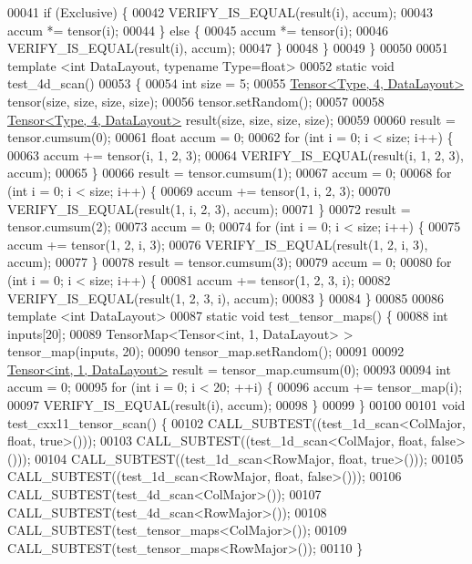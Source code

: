 \begin{DoxyCode}
00041     \textcolor{keywordflow}{if} (Exclusive) \{
00042       VERIFY\_IS\_EQUAL(result(i), accum);
00043       accum *= tensor(i);
00044     \} \textcolor{keywordflow}{else} \{
00045       accum *= tensor(i);
00046       VERIFY\_IS\_EQUAL(result(i), accum);
00047     \}
00048   \}
00049 \}
00050 
00051 \textcolor{keyword}{template} <\textcolor{keywordtype}{int} DataLayout, \textcolor{keyword}{typename} Type=\textcolor{keywordtype}{float}>
00052 \textcolor{keyword}{static} \textcolor{keywordtype}{void} test\_4d\_scan()
00053 \{
00054   \textcolor{keywordtype}{int} size = 5;
00055   \hyperlink{class_eigen_1_1_tensor}{Tensor<Type, 4, DataLayout>} tensor(size, size, size, size);
00056   tensor.setRandom();
00057 
00058   \hyperlink{class_eigen_1_1_tensor}{Tensor<Type, 4, DataLayout>} result(size, size, size, size);
00059 
00060   result = tensor.cumsum(0);
00061   \textcolor{keywordtype}{float} accum = 0;
00062   \textcolor{keywordflow}{for} (\textcolor{keywordtype}{int} i = 0; i < size; i++) \{
00063     accum += tensor(i, 1, 2, 3);
00064     VERIFY\_IS\_EQUAL(result(i, 1, 2, 3), accum);
00065   \}
00066   result = tensor.cumsum(1);
00067   accum = 0;
00068   \textcolor{keywordflow}{for} (\textcolor{keywordtype}{int} i = 0; i < size; i++) \{
00069     accum += tensor(1, i, 2, 3);
00070     VERIFY\_IS\_EQUAL(result(1, i, 2, 3), accum);
00071   \}
00072   result = tensor.cumsum(2);
00073   accum = 0;
00074   \textcolor{keywordflow}{for} (\textcolor{keywordtype}{int} i = 0; i < size; i++) \{
00075     accum += tensor(1, 2, i, 3);
00076     VERIFY\_IS\_EQUAL(result(1, 2, i, 3), accum);
00077   \}
00078   result = tensor.cumsum(3);
00079   accum = 0;
00080   \textcolor{keywordflow}{for} (\textcolor{keywordtype}{int} i = 0; i < size; i++) \{
00081     accum += tensor(1, 2, 3, i);
00082     VERIFY\_IS\_EQUAL(result(1, 2, 3, i), accum);
00083   \}
00084 \}
00085 
00086 \textcolor{keyword}{template} <\textcolor{keywordtype}{int} DataLayout>
00087 \textcolor{keyword}{static} \textcolor{keywordtype}{void} test\_tensor\_maps() \{
00088   \textcolor{keywordtype}{int} inputs[20];
00089   TensorMap<Tensor<int, 1, DataLayout> > tensor\_map(inputs, 20);
00090   tensor\_map.setRandom();
00091 
00092   \hyperlink{class_eigen_1_1_tensor}{Tensor<int, 1, DataLayout>} result = tensor\_map.cumsum(0);
00093 
00094   \textcolor{keywordtype}{int} accum = 0;
00095   \textcolor{keywordflow}{for} (\textcolor{keywordtype}{int} i = 0; i < 20; ++i) \{
00096     accum += tensor\_map(i);
00097     VERIFY\_IS\_EQUAL(result(i), accum);
00098   \}
00099 \}
00100 
00101 \textcolor{keywordtype}{void} test\_cxx11\_tensor\_scan() \{
00102   CALL\_SUBTEST((test\_1d\_scan<ColMajor, float, true>()));
00103   CALL\_SUBTEST((test\_1d\_scan<ColMajor, float, false>()));
00104   CALL\_SUBTEST((test\_1d\_scan<RowMajor, float, true>()));
00105   CALL\_SUBTEST((test\_1d\_scan<RowMajor, float, false>()));
00106   CALL\_SUBTEST(test\_4d\_scan<ColMajor>());
00107   CALL\_SUBTEST(test\_4d\_scan<RowMajor>());
00108   CALL\_SUBTEST(test\_tensor\_maps<ColMajor>());
00109   CALL\_SUBTEST(test\_tensor\_maps<RowMajor>());
00110 \}
\end{DoxyCode}
